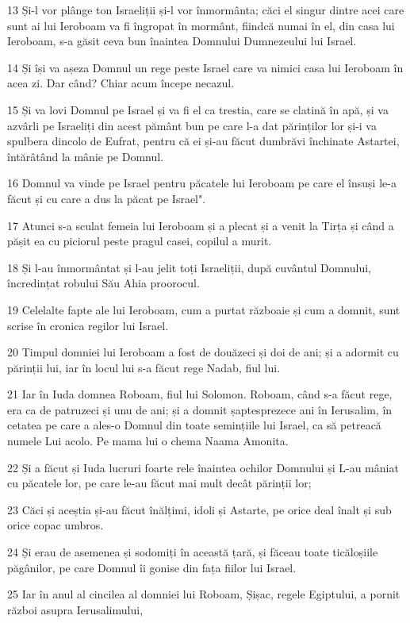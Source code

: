 \par 13 Și-l vor plânge ton Israeliții și-l vor înmormânta; căci el singur dintre acei care sunt ai lui Ieroboam va fi îngropat în mormânt, fiindcă numai în el, din casa lui Ieroboam, s-a găsit ceva bun înaintea Domnului Dumnezeului lui Israel.
\par 14 Și își va așeza Domnul un rege peste Israel care va nimici casa lui Ieroboam în acea zi. Dar când? Chiar acum începe necazul.
\par 15 Și va lovi Domnul pe Israel și va fi el ca trestia, care se clatină în apă, și va azvârli pe Israeliți din acest pământ bun pe care l-a dat părinților lor și-i va spulbera dincolo de Eufrat, pentru că ei și-au făcut dumbrăvi închinate Astartei, întărâtând la mânie pe Domnul.
\par 16 Domnul va vinde pe Israel pentru păcatele lui Ieroboam pe care el însuși le-a făcut și cu care a dus la păcat pe Israel".
\par 17 Atunci s-a sculat femeia lui Ieroboam și a plecat și a venit la Tirța și când a pășit ea cu piciorul peste pragul casei, copilul a murit.
\par 18 Și l-au înmormântat și l-au jelit toți Israeliții, după cuvântul Domnului, încredințat robului Său Ahia proorocul.
\par 19 Celelalte fapte ale lui Ieroboam, cum a purtat războaie și cum a domnit, sunt scrise în cronica regilor lui Israel.
\par 20 Timpul domniei lui Ieroboam a fost de douăzeci și doi de ani; și a adormit cu părinții lui, iar în locul lui s-a făcut rege Nadab, fiul lui.
\par 21 Iar în Iuda domnea Roboam, fiul lui Solomon. Roboam, când s-a făcut rege, era ca de patruzeci și unu de ani; și a domnit șaptesprezece ani în Ierusalim, în cetatea pe care a ales-o Domnul din toate semințiile lui Israel, ca să petreacă numele Lui acolo. Pe mama lui o chema Naama Amonita.
\par 22 Și a făcut și Iuda lucruri foarte rele înaintea ochilor Domnului și L-au mâniat cu păcatele lor, pe care le-au făcut mai mult decât părinții lor;
\par 23 Căci și aceștia și-au făcut înălțimi, idoli și Astarte, pe orice deal înalt și sub orice copac umbros.
\par 24 Și erau de asemenea și sodomiți în această țară, și făceau toate ticăloșiile păgânilor, pe care Domnul îi gonise din fața fiilor lui Israel.
\par 25 Iar în anul al cincilea al domniei lui Roboam, Șișac, regele Egiptului, a pornit război asupra Ierusalimului,
